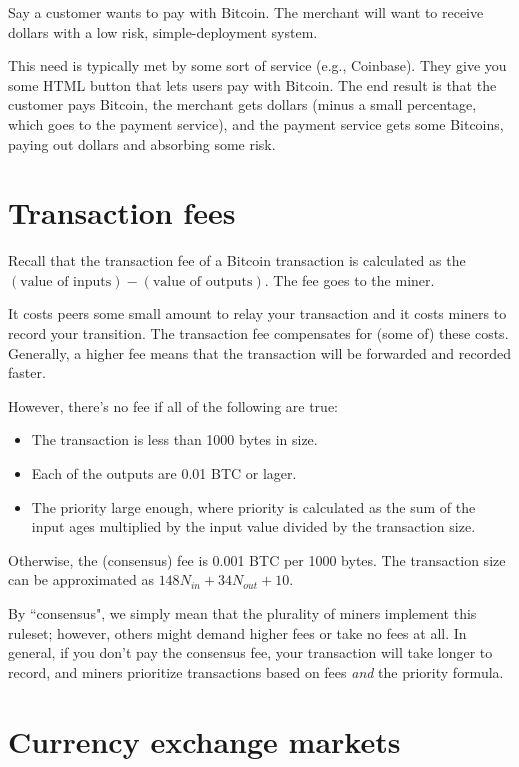 \documentclass[12pt]{article}
\begin{document}
Say a customer wants to pay with Bitcoin. The merchant will want to receive dollars with a low risk, simple-deployment system.

This need is typically met by some sort of service (e.g., Coinbase). They give you some HTML button that lets users pay with Bitcoin. The end result is that the customer pays Bitcoin, the merchant gets dollars (minus a small percentage, which goes to the payment service), and the payment service gets some Bitcoins, paying out dollars and absorbing some risk.

\section*{Transaction fees}

Recall that the transaction fee of a Bitcoin transaction is calculated as the $(\text{value of inputs}) - (\text{value of outputs})$. The fee goes to the miner.

It costs peers some small amount to relay your transaction and it costs miners to record your transition. The transaction fee compensates for (some of) these costs. Generally, a higher fee means that the transaction will be forwarded and recorded faster.

However, there's no fee if all of the following are true:
\begin{itemize}
\item The transaction is less than 1000 bytes in size.
\item Each of the outputs are 0.01 BTC or lager.
\item The priority large enough, where priority is calculated as the sum of the input ages multiplied by the input value divided by the transaction size.
\end{itemize}

Otherwise, the (consensus) fee is 0.001 BTC per 1000 bytes. The transaction size can be approximated as $148 N_{in} + 34 N_{out} + 10$.

By ``consensus", we simply mean that the plurality of miners implement this ruleset; however, others might demand higher fees or take no fees at all. In general, if you don't pay the consensus fee, your transaction will take longer to record, and miners prioritize transactions based on fees \textit{and} the priority formula.

\section*{Currency exchange markets}
\end{document}
